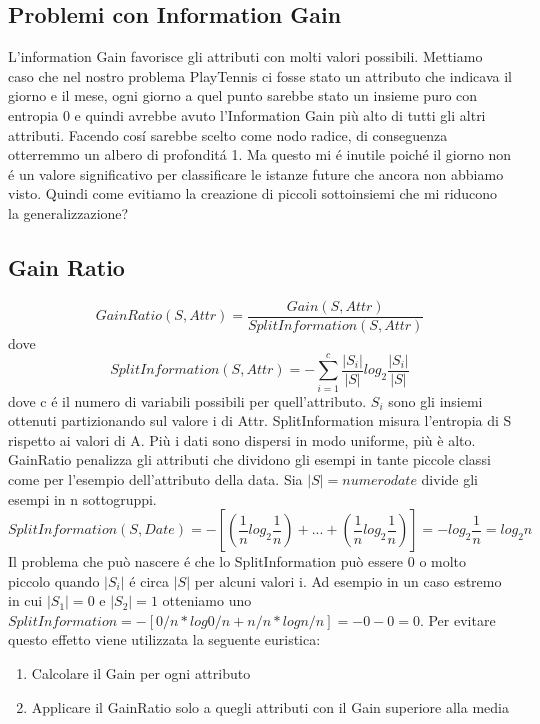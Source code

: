 \documentclass{article}
\begin{document}
\subsection{Problemi con Information Gain}
L'information Gain favorisce gli attributi con molti valori possibili. Mettiamo caso che nel nostro problema PlayTennis ci fosse stato un attributo che indicava il giorno e il mese, ogni giorno a quel punto sarebbe stato un insieme puro con entropia 0 e quindi avrebbe avuto l'Information Gain più alto di tutti gli altri attributi. Facendo cosí sarebbe scelto come nodo radice, di conseguenza otterremmo un albero di profonditá 1. Ma questo mi é inutile poiché il giorno non é un valore significativo per classificare le istanze future che ancora non abbiamo visto. Quindi come evitiamo la creazione di piccoli sottoinsiemi che mi riducono la generalizzazione?

\subsection{Gain Ratio}
\begin{equation}
    GainRatio(S,Attr)=\frac{Gain(S,Attr)}{SplitInformation(S,Attr)}
\end{equation}
dove
\begin{equation}
    SplitInformation(S,Attr)=-\sum_{i=1}^c \frac{|S_i|}{|S|}log_2\frac{|S_i|}{|S|}
\end{equation}
dove c é il numero di variabili possibili per quell'attributo. $S_i$ sono gli insiemi ottenuti partizionando sul valore i di Attr. \newline 
SplitInformation misura l'entropia di S rispetto ai valori di A. Più i dati sono dispersi in modo uniforme, più è alto. GainRatio penalizza gli attributi che dividono gli esempi in tante piccole classi come per l'esempio dell'attributo della data. Sia $| S | = numerodate$ divide gli esempi in n sottogruppi.
\begin{equation}
    SplitInformation(S, Date)= -[(\frac{1}{n} log_2 \frac{1}{n})+...+ (\frac{1}{n}log_2 \frac{1}{n})]= - log_2\frac{1}{n} =log_2n
\end{equation}
Il problema che può nascere é che lo SplitInformation può essere 0 o molto piccolo quando $|S_i|$ é circa $|S|$ per alcuni valori i. Ad esempio in un caso estremo in cui $|S_1|=0$ e $|S_2|=1$ otteniamo uno $SplitInformation = -[0/n * log 0/n + n/n * log n/n] = - 0 - 0 = 0$. Per evitare questo effetto viene utilizzata la seguente euristica:
\begin{enumerate}
    \item Calcolare il Gain per ogni attributo
    \item Applicare il GainRatio solo a quegli attributi con il Gain superiore alla media
\end{enumerate}
\end{document}
